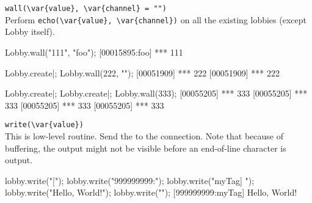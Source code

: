 \begin{urbiscriptapi}
\item \lstinline|wall(\var{value}, \var{channel} = "")|\\
  Perform \lstinline|echo(\var{value}, \var{channel})| on all the
  existing lobbies (except Lobby itself).
\begin{urbiscript}[firstnumber=1]
Lobby.wall("111", "foo");
[00015895:foo] *** 111

Lobby.create|;
Lobby.wall(222, "");
[00051909] *** 222
[00051909] *** 222

Lobby.create|;
Lobby.create|;
Lobby.wall(333);
[00055205] *** 333
[00055205] *** 333
[00055205] *** 333
[00055205] *** 333
\end{urbiscript}

\item \lstinline|write(\var{value})|\\
  This is low-level routine.  Send the  
  to the connection.  Note that because of buffering, the output might
  not be visible before an end-of-line character is output.
\begin{urbiscript}
lobby.write("[");
lobby.write("999999999:");
lobby.write("myTag] ");
lobby.write("Hello, World!");
lobby.write("\n");
[999999999:myTag] Hello, World!
\end{urbiscript}
\end{urbiscriptapi}

